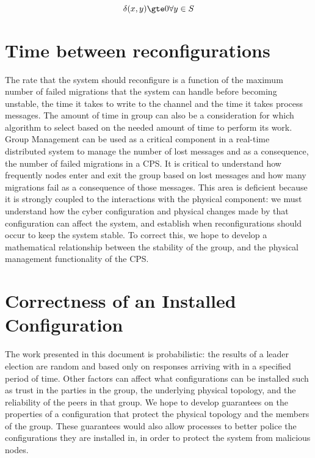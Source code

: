 \begin{equation}
{ \delta(x,y) \gte 0 \forall y \in S }
\end{equation}


\section{Time between reconfigurations}

The rate that the system should reconfigure is a function of the maximum number of failed migrations that the system can handle before becoming unstable, the time it takes to write to the channel and the time it takes process messages.
The amount of time in group can also be a consideration for which algorithm to select based on the needed amount of time to perform its work.
 Group Management can be used as a critical component in a real-time distributed system to manage the number of lost messages and as a consequence, the number of failed migrations in a CPS.
 It is critical to understand how frequently nodes enter and exit the group based on lost messages and how many migrations fail as a consequence of those messages.
 This area is deficient because it is strongly coupled to the interactions with the physical component: we must understand how the cyber configuration and physical changes made by that configuration can affect the system, and establish when reconfigurations should occur to keep the system stable.
 To correct this, we hope to develop a mathematical relationship between the stability of the group, and the physical management functionality of the CPS.

\section{Correctness of an Installed Configuration}

 The work presented in this document is probabilistic: the results of a leader election are random and based only on responses arriving with in a specified period of time. Other factors can affect what configurations can be installed such as trust in the parties in the group, the underlying physical topology, and the reliability of the peers in that group. We hope to develop guarantees on the properties of a configuration that protect the physical topology and the members of the group. These guarantees would also allow processes to better police the configurations they are installed in, in order to protect the system from malicious nodes.

